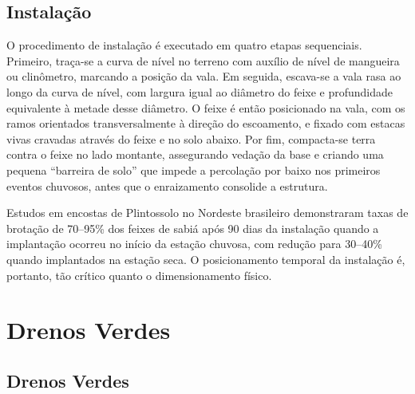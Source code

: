 \documentclass[
  portuguese,
  11pt,
  a4paper,
  open=any]{scrbook}
\begin{document}
\subsection{Instalação}\label{instalauxe7uxe3o}

O procedimento de instalação é executado em quatro etapas sequenciais.
Primeiro, traça-se a curva de nível no terreno com auxílio de nível de
mangueira ou clinômetro, marcando a posição da vala. Em seguida,
escava-se a vala rasa ao longo da curva de nível, com largura igual ao
diâmetro do feixe e profundidade equivalente à metade desse diâmetro. O
feixe é então posicionado na vala, com os ramos orientados
transversalmente à direção do escoamento, e fixado com estacas vivas
cravadas através do feixe e no solo abaixo. Por fim, compacta-se terra
contra o feixe no lado montante, assegurando vedação da base e criando
uma pequena ``barreira de solo'' que impede a percolação por baixo nos
primeiros eventos chuvosos, antes que o enraizamento consolide a
estrutura.

\begin{tcolorbox}[enhanced jigsaw, leftrule=.75mm, colframe=quarto-callout-note-color-frame, colback=white, bottomrule=.15mm, opacityback=0, colbacktitle=quarto-callout-note-color!10!white, breakable, bottomtitle=1mm, opacitybacktitle=0.6, title=\textcolor{quarto-callout-note-color}{\faInfo}\hspace{0.5em}{Taxa de sobrevivência}, titlerule=0mm, toprule=.15mm, toptitle=1mm, rightrule=.15mm, left=2mm, arc=.35mm, coltitle=black]

Estudos em encostas de Plintossolo no Nordeste brasileiro demonstraram
taxas de brotação de 70--95\% dos feixes de sabiá após 90 dias da
instalação quando a implantação ocorreu no início da estação chuvosa,
com redução para 30--40\% quando implantados na estação seca. O
posicionamento temporal da instalação é, portanto, tão crítico quanto o
dimensionamento físico.

\end{tcolorbox}

\section{Drenos Verdes}\label{drenos-verdes}

\subsection{Drenos Verdes}\label{drenos-verdes-1}
\end{document}
